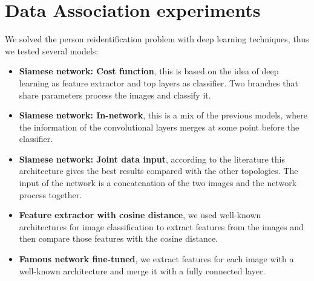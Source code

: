 \begin{table}[H]
\centering

\caption{Comparision tracking modules.}
\label{tableResultsTrack}
\end{table}



\section{Data Association experiments}\label{exper:entrenar}


We solved the person reidentification problem with deep learning techniques, thus we tested several models:


\begin{itemize}


\item \textbf{Siamese network: Cost function}, this is based on the idea of deep learning as feature extractor and top layers as classifier. Two branches that share parameters process the images and classify it.

\item \textbf{Siamese network: In-network}, this is a mix of the previous models, where the information of the convolutional layers merges at some point before the classifier.

\item \textbf{Siamese network: Joint data input}, according to the literature this architecture gives the best results compared with the other topologies. The input of the network is a concatenation of the two images and the network process together.


\item \textbf{Feature extractor with cosine distance}, we used well-known architectures for image classification to extract features from the images and then compare those features with the cosine distance.

\item \textbf{Famous network fine-tuned}, we extract features for each image with a well-known architecture and merge it with a fully connected layer.

\end{itemize}

